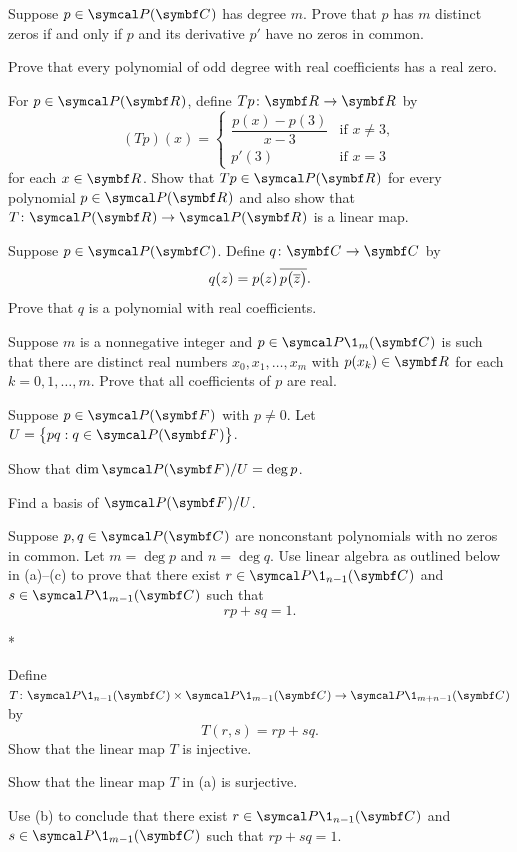 \begin{exercises}
\exercise
Suppose $p \in \P(\C{})$ has degree $m$.  Prove that $p$ has $m$ distinct zeros if
and only if $p$ and its derivative $p'$ have no zeros in common.


\exercise
Prove that every polynomial of odd degree with real coefficients has a real zero.\label{4oddzero}


\exercise
For $p \in \P(\R{})$, define $\fun {Tp} {\R{}} {\R{}}$ by
\[
(Tp)(x) =
\begin{cases}
\dfrac{p(x) - p(3)}{x-3} & \text{if } x \ne 3,\\[9bp]
p' \! (3) & \text{if } x = 3
\end{cases}
\]
for each $x \in \R{}$. Show that $Tp \in \P(\R{})$ for every polynomial $p \in \P(\R{})$ and also show that $\fun T {\P(\R{})} {\P(\R{})}$ is a linear map.


\exercise
Suppose $p \in \P(\C{})$. Define $q \colon \C{} \to \C{}$ by
\[
q(z) = p(z) \, \overline{ p\paren[\big]{\bar{z}} }.
\]
Prove that $q$ is a polynomial with real coefficients.


\exercise
Suppose $m$ is a nonnegative integer and $p \in \P\1_m(\C{})$ is such that there are distinct real numbers $x_0, x_1, \dots, x_m$ with $p(x_k) \in \R{}$ for each $k = 0, 1, \dots, m$. Prove that all coefficients of $p$ are real.


\pagebreak[2]

\exercise
Suppose $p \in \P(\F{})$ with $p \ne 0$. Let $U = \br[\big]{p q : q \in \P(\F{})}$.
\begin{subtheorem}
\item
Show that $\dim \P(\F{})/U = \deg p$.
\item
Find a basis of $\P(\F{})/U$.
\end{subtheorem}
\exercisesubtheoremend


\exercise
Suppose $p, q \in \P(\C{})$ are nonconstant polynomials with no zeros in common. Let $m = \deg p$ and $n = \deg q$. Use linear algebra as outlined below in (a)--(c) to prove that there exist
$r \in \P\1_{n-1}(\C{})$ and $s \in \P\1_{m-1}(\C{})$ such that
\[
rp + sq = 1.
\]
\begin{subtheorem}*
\item
Define $\fun T { \P\1_{n-1}(\C{}) \times \P\1_{m-1}(\C{}) } {\P\1_{m+n-1}(\C{})}$ by
\[
T(r, s) = rp + sq.
\]
Show that the linear map $T$ is injective.
\item
Show that the linear map $T$ in (a) is surjective.
\item
Use (b) to conclude that there exist $r \in \P\1_{n-1}(\C{})$ and $s \in \P\1_{m-1}(\C{})$ such that $rp + sq = 1$.
\end{subtheorem}
\exercisesubtheoremend


\end{exercises}

\CrCom

\endinput
